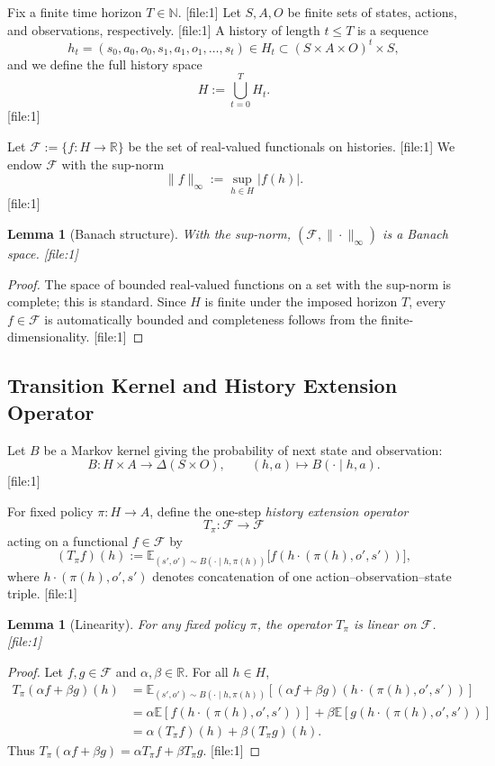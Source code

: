 \documentclass[11pt,a4paper]{article}
\theoremstyle{tealstyle}
\newtheorem{lemma}[theorem]{Lemma}
\theoremstyle{definition}
\begin{document}
Fix a finite time horizon \(T \in \mathbb{N}\). [file:1] Let \(S, A, O\) be finite sets of states, actions, and observations, respectively. [file:1] A history of length \(t \le T\) is a sequence
\[
  h_t = (s_0, a_0, o_0, s_1, a_1, o_1, \dots, s_t) \in H_t \subset (S \times A \times O)^{t} \times S,
\]
and we define the full history space
\[
  H := \bigcup_{t=0}^T H_t.
\] [file:1]

Let \(\mathcal{F} := \{ f : H \to \mathbb{R} \}\) be the set of real-valued functionals on histories. [file:1] We endow \(\mathcal{F}\) with the sup-norm
\[
  \|f\|_\infty := \sup_{h \in H} |f(h)|.
\] [file:1]

\begin{lemma}[Banach structure]
With the sup-norm, \((\mathcal{F}, \|\cdot\|_\infty)\) is a Banach space. [file:1]
\end{lemma}

\begin{proof}
The space of bounded real-valued functions on a set with the sup-norm is complete; this is standard. Since \(H\) is finite under the imposed horizon \(T\), every \(f \in \mathcal{F}\) is automatically bounded and completeness follows from the finite-dimensionality. [file:1]
\end{proof}

\subsection{Transition Kernel and History Extension Operator}

Let \(B\) be a Markov kernel giving the probability of next state and observation:
\[
  B : H \times A \to \Delta(S \times O), \qquad
  (h,a) \mapsto B(\cdot \mid h,a).
\] [file:1]

For fixed policy \(\pi : H \to A\), define the one-step \emph{history extension operator}
\[
  T_\pi : \mathcal{F} \to \mathcal{F}
\]
acting on a functional \(f \in \mathcal{F}\) by
\[
  (T_\pi f)(h) 
  := \mathbb{E}_{(s',o') \sim B(\cdot \mid h, \pi(h))}\bigl[f(h \cdot ( \pi(h), o', s'))\bigr],
\]
where \(h \cdot (\pi(h), o', s')\) denotes concatenation of one action–observation–state triple. [file:1]

\begin{lemma}[Linearity]
For any fixed policy \(\pi\), the operator \(T_\pi\) is linear on \(\mathcal{F}\). [file:1]
\end{lemma}

\begin{proof}
Let \(f,g \in \mathcal{F}\) and \(\alpha,\beta \in \mathbb{R}\). For all \(h \in H\),
\begin{align*}
  T_\pi(\alpha f + \beta g)(h)
  &= \mathbb{E}_{(s',o') \sim B(\cdot \mid h, \pi(h))}[(\alpha f + \beta g)(h \cdot (\pi(h),o',s'))] \\
  &= \alpha \mathbb{E}[f(h \cdot (\pi(h),o',s'))] + \beta \mathbb{E}[g(h \cdot (\pi(h),o',s'))] \\
  &= \alpha (T_\pi f)(h) + \beta (T_\pi g)(h).
\end{align*}
Thus \(T_\pi(\alpha f + \beta g) = \alpha T_\pi f + \beta T_\pi g\). [file:1]
\end{proof}
\end{document}

